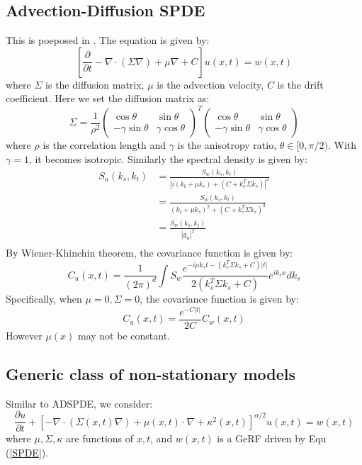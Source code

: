 \subsection{Advection-Diffusion SPDE}
This is poeposed in \cite{sigrist2015stochastic}. The equation is given by:
\begin{equation}
	\left[\frac{\partial}{\partial t} - \nabla \cdot (\Sigma \nabla)+\mu \nabla + C\right]u(x,t) = w(x,t)
\end{equation}
where $\Sigma$ is the diffusion matrix, $\mu$ is the advection velocity, $C$ is the drift coefficient.
Here we set the diffusion matrix as:
\begin{equation}
	\Sigma = \frac{1}{\rho^2}\begin{pmatrix}
		\cos\theta & \sin\theta \\
		-\gamma\sin\theta & \gamma\cos\theta
	\end{pmatrix}^T\begin{pmatrix}
		\cos\theta & \sin\theta \\
		-\gamma\sin\theta & \gamma\cos\theta
	\end{pmatrix}
\end{equation}
where $\rho$ is the correlation length and $\gamma$ is the anisotropy ratio, $\theta\in [0, \pi/2)$. With $\gamma = 1$, it becomes isotropic.
Similarly the spectral density is given by:
\begin{equation}
	\begin{aligned}
		S_u(k_s, k_t) &= \frac{S_w(k_s, k_t)}{\left|i(k_t + \mu k_s) + (C + k_s^T\Sigma k_s)\right|^2}\\
		&= \frac{S_w(k_s, k_t)}{(k_t + \mu k_s)^2 + (C + k_s^T\Sigma k_s)^2}\\
		&= \frac{S_w(k_s, k_t)}{\left|g_u\right|^2}\\
	\end{aligned}
\end{equation}
By Wiener-Khinchin theorem, the covariance function is given by:
\begin{equation}
	C_u(x, t) = \frac{1}{(2\pi)^{d}}\int S_w\frac{e^{-i\mu k_s t-(k_s^T\Sigma k_s + C)|t|}}{2(k_s^T\Sigma k_s + C)}e^{ik_s x}dk_s
\end{equation}
Specifically, when $\mu = 0, \Sigma = 0$, the covariance function is given by:
\begin{equation}
	C_u(x, t) = \frac{e^{-C|t|}}{2C}C_w(x, t)
\end{equation}
However $\mu(x)$ may not be constant.

\subsection{Generic class of non-stationary models}
Similar to ADSPDE, we consider:
\begin{equation}
	\frac{\partial u}{\partial t} + \left[ - \nabla \cdot (\Sigma(x, t) \nabla)+\mu(x, t)\cdot \nabla + \kappa^2(x, t)\right]^{\alpha/2}u(x,t) = w(x,t)
\end{equation}
where $\mu, \Sigma, \kappa$ are functions of $x, t$, and $w(x, t)$ is a GeRF driven by Equ (\ref{SPDE}).
